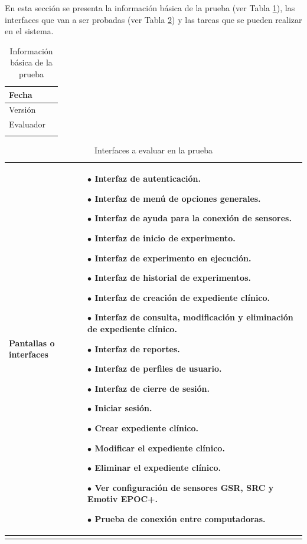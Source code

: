 En esta sección se presenta la información básica de la prueba (ver Tabla \ref{datos1}), las interfaces que van a ser probadas (ver Tabla \ref{datos2}) y las tareas que se pueden realizar en el sistema.

\begin{longtable}{||p{2cm}|p{12cm}||}
\hline
{Fecha}&{}\\ \hline
{Versión}&{}\\ \hline
{Evaluador}&{}\\ \hline
\caption{Información básica de la prueba}
\label{datos1}
\end{longtable}


\begin{longtable}{||p{2cm}|p{12cm}||}
\hline
{Pantallas o interfaces}&{$\bullet$ Interfaz de autenticación.

$\bullet$ Interfaz de menú de opciones generales.

$\bullet$ Interfaz de ayuda para la conexión de sensores.

$\bullet$ Interfaz de inicio de experimento.

$\bullet$ Interfaz de experimento en ejecución.

$\bullet$ Interfaz de historial de experimentos.

$\bullet$ Interfaz de creación de expediente clínico.

$\bullet$ Interfaz de consulta, modificación y eliminación de expediente clínico.

$\bullet$ Interfaz de reportes.

$\bullet$ Interfaz de perfiles de usuario.

$\bullet$ Interfaz de cierre de sesión.

$\bullet$ Iniciar sesión.
	
	$\bullet$ Crear expediente clínico.

	$\bullet$ Modificar el expediente clínico.

	$\bullet$ Eliminar el expediente clínico.

	$\bullet$ Ver configuración de sensores GSR, SRC y Emotiv EPOC+.

	$\bullet$ Prueba de conexión entre computadoras.
}\\ \hline
\caption{Interfaces a evaluar en la prueba}
\label{datos2}
\end{longtable}

\newpage

